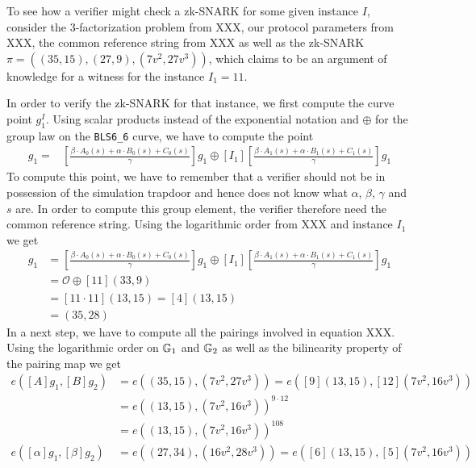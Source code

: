 \begin{example} To see how a verifier might check  
a zk-SNARK for some given instance $I$, consider the $3$-factorization problem from XXX, our protocol parameters from XXX, the common reference string from XXX as well as the zk-SNARK $\pi=((35,15),(27,9),(7v^2,27v^3))$, which claims to be an argument of knowledge for a witness for the instance $I_1=11$.

In order to verify the zk-SNARK for that instance, we first compute the curve point $g_1^I$. Using scalar products instead of the exponential notation and $\oplus$ for the group law on the \texttt{BLS6\_6} curve, we have to compute the point
\begin{align*}
[I]g_1 = & [\frac{\beta\cdot A_{0}(s)+\alpha\cdot B_{0}(s)+C_{0}(s)}{\gamma}]g_1 \oplus [I_1][\frac{\beta\cdot A_{1}(s)+\alpha\cdot B_{1}(s)+C_{1}(s)}{\gamma}]g_1
\end{align*}
To compute this point, we have to remember that a verifier should not be in possession of the simulation trapdoor and hence does not know what $\alpha$, $\beta$, $\gamma$ and $s$ are. In order to compute this group element, the verifier therefore need the common reference string. Using the logarithmic order from XXX and instance $I_1$ we get
\begin{align*}
[I]g_1 & = [\frac{\beta\cdot A_{0}(s)+\alpha\cdot B_{0}(s)+C_{0}(s)}{\gamma}]g_1 \oplus [I_1][\frac{\beta\cdot A_{1}(s)+\alpha\cdot B_{1}(s)+C_{1}(s)}{\gamma}]g_1\\
       & = \mathcal{O} \oplus [11](33,9)\\
       & = [11\cdot 11](13,15) = [4](13,15)\\
       & = (35,28)
\end{align*} 
In a next step, we have to compute all the pairings involved in equation XXX. Using the logarithmic order on $\mathbb{G}_1$ and $\mathbb{G}_2$ as well as the bilinearity property of the pairing map we get
\begin{align*}
e([A]g_1,[B]g_2) & = e((35,15),(7v^2,27v^3))
                   = e([9](13,15),[12](7v^2,16v^3))\\
               & = e((13,15),(7v^2,16v^3))^{9\cdot 12}\\
               & = e((13,15),(7v^2,16v^3))^{108}\\
e([\alpha]g_1,[\beta]g_2) & = e((27,34),(16v^2,28v^3)) 
                            = e([6](13,15),[5](7v^2,16v^3))\\

\end{align*}
\end{example}
